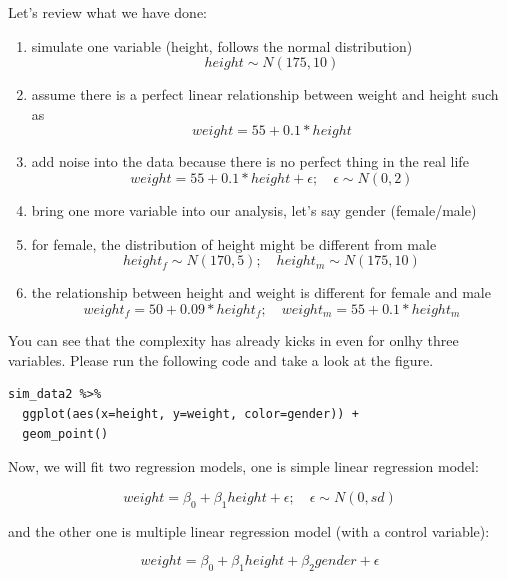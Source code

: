 \documentclass[11pt]{article}
\theoremstyle{definition}
\begin{document}
Let's review what we have done:

\begin{enumerate}
  \item simulate one variable (height, follows the normal distribution)
  $$height \sim N(175, 10)$$
  \item assume there is a perfect linear relationship between weight and height such as
  $$ weight = 55 + 0.1 * height  $$
  \item add noise into the data because there is no perfect thing in the real life
  $$
weight = 55 + 0.1 * height + \epsilon; \quad \epsilon \sim N(0, 2)
$$
\item bring one more variable into our analysis, let's say gender (female/male)
\item for female, the distribution of height might be different from male
$$
height_f \sim N(170, 5); \quad height_m \sim N(175, 10)
$$
\item the relationship between height and weight is different for female and male
$$
weight_f = 50 + 0.09 * height_f; \quad weight_m = 55 + 0.1 * height_m
$$
\end{enumerate}

You can see that the complexity has already kicks in even for onlhy three variables. Please
run the following code and take a look at the figure.

\begin{lstlisting}
sim_data2 %>%
  ggplot(aes(x=height, y=weight, color=gender)) + 
  geom_point()
\end{lstlisting}

Now, we will fit two regression models, one is simple linear regression model: 


$$
weight = \beta_0 + \beta_1 height + \epsilon; \quad \epsilon \sim N(0, sd)
$$

and the other one is multiple linear regression model (with a control variable):

$$
weight = \beta_0 + \beta_1 height + \beta_2 gender + \epsilon
$$
\end{document}
